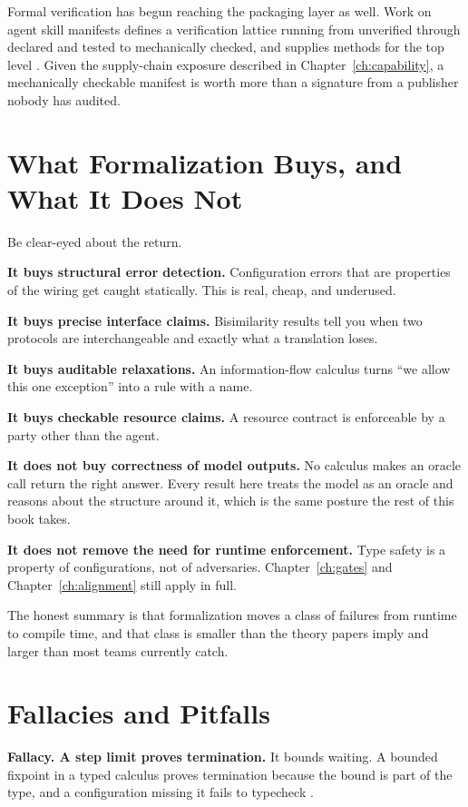Formal verification has begun reaching the packaging layer as well. Work on agent
skill manifests defines a verification lattice running from unverified through
declared and tested to mechanically checked, and supplies methods for the top
level \cite{skillverify2026}. Given the supply-chain exposure described in
Chapter~\ref{ch:capability}, a mechanically checkable manifest is worth more than
a signature from a publisher nobody has audited.

\section{What Formalization Buys, and What It Does Not}

Be clear-eyed about the return.

\textbf{It buys structural error detection.} Configuration errors that are
properties of the wiring get caught statically. This is real, cheap, and
underused.

\textbf{It buys precise interface claims.} Bisimilarity results tell you when two
protocols are interchangeable and exactly what a translation loses.

\textbf{It buys auditable relaxations.} An information-flow calculus turns
``we allow this one exception'' into a rule with a name.

\textbf{It buys checkable resource claims.} A resource contract is enforceable by
a party other than the agent.

\textbf{It does not buy correctness of model outputs.} No calculus makes an oracle
call return the right answer. Every result here treats the model as an oracle and
reasons about the structure around it, which is the same posture the rest of this
book takes.

\textbf{It does not remove the need for runtime enforcement.} Type safety is a
property of configurations, not of adversaries. Chapter~\ref{ch:gates} and
Chapter~\ref{ch:alignment} still apply in full.

The honest summary is that formalization moves a class of failures from runtime
to compile time, and that class is smaller than the theory papers imply and
larger than most teams currently catch.

\section{Fallacies and Pitfalls}

\textbf{Fallacy. A step limit proves termination.} It bounds waiting. A bounded
fixpoint in a typed calculus proves termination because the bound is part of the
type, and a configuration missing it fails to typecheck \cite{lambdaA2026}.

